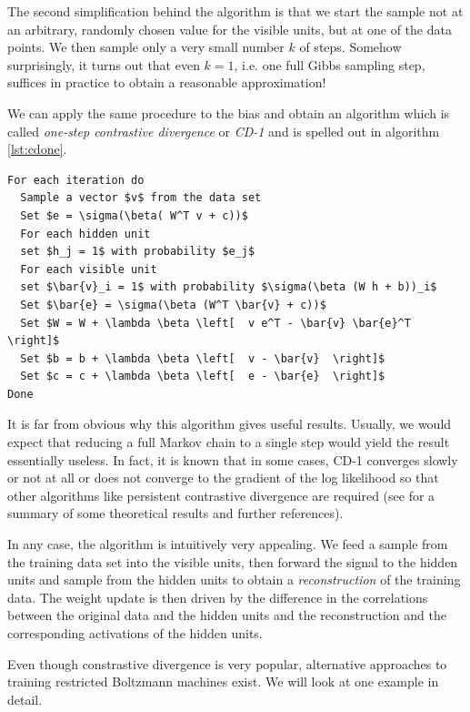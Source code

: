 \documentclass[a4paper, draft]{article}
\theoremstyle{own}
\theoremstyle{remark}
\begin{document}
The second simplification behind the algorithm is that we start the sample not at an arbitrary, randomly chosen value for the visible units, but at one of the data points. We then sample only a very small number $k$ of steps. Somehow surprisingly, it turns out that even $k=1$, i.e. one full Gibbs sampling step, suffices in practice to obtain a reasonable approximation! 

We can apply the same procedure to the bias and obtain an algorithm which is called {\em one-step contrastive divergence} or {\em CD-1} and is spelled out in algorithm \ref{lst:cdone}. 



\begin{lstlisting}[mathescape=true,frame=single, label=lst:cdone, float=ht,
captionpos=t, caption=One-step contrastive divergence]
For each iteration do
  Sample a vector $v$ from the data set
  Set $e = \sigma(\beta( W^T v + c))$
  For each hidden unit
  set $h_j = 1$ with probability $e_j$
  For each visible unit
  set $\bar{v}_i = 1$ with probability $\sigma(\beta (W h + b))_i$
  Set $\bar{e} = \sigma(\beta (W^T \bar{v} + c))$
  Set $W = W + \lambda \beta \left[  v e^T - \bar{v} \bar{e}^T  \right]$
  Set $b = b + \lambda \beta \left[  v - \bar{v}  \right]$
  Set $c = c + \lambda \beta \left[  e - \bar{e}  \right]$
Done
\end{lstlisting}


It is far from obvious why this algorithm gives useful results. Usually, we would expect that reducing a full Markov chain to a single step would yield the result essentially useless. In fact, it is known that in some cases, CD-1 converges slowly or not at all or does not converge to the gradient of the log likelihood so that other algorithms like persistent contrastive divergence are required (see \cite{FischerIgel2014} for a summary of some theoretical results and further references). 

In any case, the algorithm is intuitively very appealing. We feed a sample from the training data set into the visible units, then forward the signal to the hidden units and sample from the hidden units to obtain a {\em reconstruction} of the training data. The weight update is then driven by the difference in the correlations between the original data and the hidden units and the reconstruction and the corresponding activations of the hidden units. 


Even though constrastive divergence is very popular, alternative approaches to training restricted Boltzmann machines exist. We will look at one example in detail. 
\end{document}

